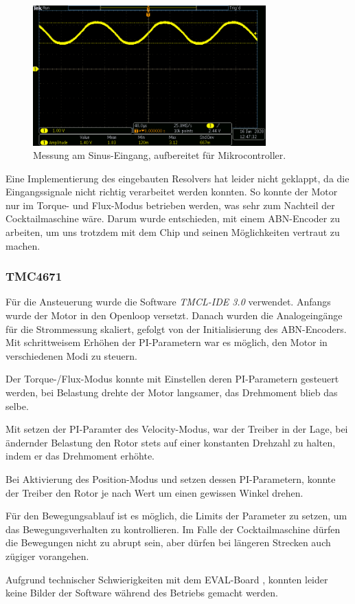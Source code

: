 \begin{figure}[h!]
	\centering
	\includegraphics[width=0.8\textwidth]{graphics/Resolver_Sin_Verst_2.png}
	\caption{Messung am Sinus-Eingang, aufbereitet für Mikrocontroller.} 
	\label{fig:Hardware_Resolver_Interface_7}
\end{figure}

Eine Implementierung des eingebauten Resolvers hat leider nicht geklappt, da die Eingangssignale nicht richtig verarbeitet werden konnten. So konnte der Motor nur im Torque- und Flux-Modus betrieben werden, was sehr zum Nachteil der Cocktailmaschine wäre. Darum wurde entschieden, mit einem ABN-Encoder zu arbeiten, um uns trotzdem mit dem Chip und seinen Möglichkeiten vertraut zu machen.

\subsubsection{TMC4671}\label{subsubse:Hardware_TMC4671}

Für die Ansteuerung wurde die Software \textit{TMCL-IDE 3.0} verwendet. Anfangs wurde der Motor in den Openloop versetzt. Danach wurden die Analogeingänge für die Strommessung skaliert, gefolgt von der Initialisierung des ABN-Encoders. Mit schrittweisem Erhöhen der PI-Parametern war es möglich, den Motor in verschiedenen Modi zu steuern. 

Der Torque-/Flux-Modus konnte mit Einstellen deren PI-Parametern gesteuert werden, bei Belastung drehte der Motor langsamer, das Drehmoment blieb das selbe.

Mit setzen der PI-Paramter des Velocity-Modus, war der Treiber in der Lage, bei ändernder Belastung den Rotor stets auf einer konstanten Drehzahl zu halten, indem er das Drehmoment erhöhte.

Bei Aktivierung des Position-Modus und setzen dessen PI-Parametern, konnte der Treiber den Rotor je nach Wert um einen gewissen Winkel drehen. 

Für den Bewegungsablauf ist es möglich, die Limits der Parameter zu setzen, um das Bewegungsverhalten zu kontrollieren. Im Falle der Cocktailmaschine dürfen die Bewegungen nicht zu abrupt sein, aber dürfen bei längeren Strecken auch zügiger vorangehen.

Aufgrund technischer Schwierigkeiten mit dem EVAL-Board , konnten leider keine Bilder der Software während des Betriebs gemacht werden.